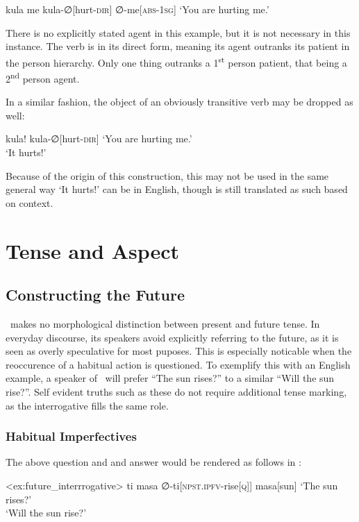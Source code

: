 \ex
\begingl
\glpreamble kula me
\endpreamble
kula-∅[hurt-\textsc{dir}]
∅-me[\textsc{abs-1sg}]
\glft `You are hurting me.'
\endgl
\xe

There is no explicitly stated agent in this example, but it is not necessary in this instance. The verb  is in its direct form, meaning its agent outranks its patient in the person hierarchy. Only one thing outranks a 1\textsuperscript{st} person patient, that being a 2\textsuperscript{nd} person agent.

In a similar fashion, the object of an obviously transitive verb may be dropped as well:

\ex
\begingl
\glpreamble kula!
\endpreamble
kula-∅[hurt-\textsc{dir}]
\glft `You are hurting me.'\\`It hurts!'
\endgl
\xe

Because of the origin of this construction, this may not be used in the same general way `It hurts!' can be in English, though  is still translated as such based on context.

\section{Tense and Aspect}
\subsection{Constructing the Future}

\langname\ makes no morphological distinction between present and future tense. In everyday discourse, its speakers avoid explicitly referring to the future, as it is seen as overly speculative for most puposes. This is especially noticable when the reoccurence of a habitual action is questioned. To exemplify this with an English example, a speaker of \langname\ will prefer ``The sun rises?'' to a similar ``Will the sun rise?''. Self evident truths such as these do not require additional tense marking, as the interrogative fills the same role.

\subsubsection{Habitual Imperfectives}

The above question and and answer would be rendered as follows in \langname :

\ex<ex:future_interrrogative>
\begingl
\glpreamble ti masa
\endpreamble
∅-ti[\textsc{npst.ipfv-}rise\textsc{[q]}]
masa[sun]
\glft `The sun rises?'\\`Will the sun rise?'
\endgl
\xe

